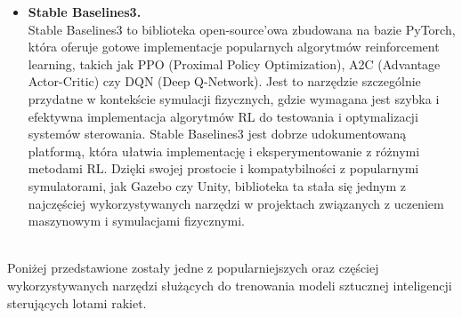 \begin{itemize}
    \item \textbf{Stable Baselines3.} \\
    Stable Baselines3 to biblioteka open-source'owa zbudowana na bazie PyTorch, która oferuje gotowe implementacje popularnych algorytmów reinforcement learning, takich jak PPO (Proximal Policy Optimization), A2C (Advantage Actor-Critic) czy DQN (Deep Q-Network). Jest to narzędzie szczególnie przydatne w kontekście symulacji fizycznych, gdzie wymagana jest szybka i efektywna implementacja algorytmów RL do testowania i optymalizacji systemów sterowania. Stable Baselines3 jest dobrze udokumentowaną platformą, która ułatwia implementację i eksperymentowanie z różnymi metodami RL. Dzięki swojej prostocie i kompatybilności z popularnymi symulatorami, jak Gazebo czy Unity, biblioteka ta stała się jednym z najczęściej wykorzystywanych narzędzi w projektach związanych z uczeniem maszynowym i symulacjami fizycznymi.
\end{itemize}

\\
Poniżej przedstawione zostały jedne
z popularniejszych oraz częściej wykorzystywanych narzędzi służących do
trenowania modeli sztucznej inteligencji sterujących lotami rakiet.\\

